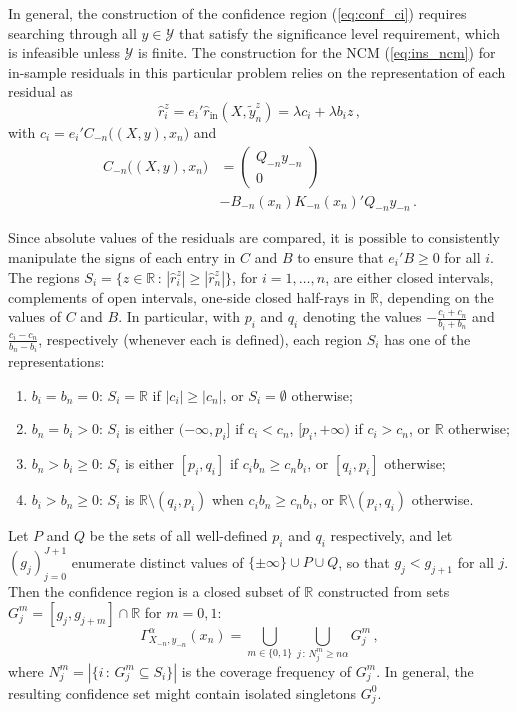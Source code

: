 \documentclass{ITaSconf}
\newcommand{\Ycal}{\mathcal{Y}}
\newcommand{\Real}{\mathbb{R}}
\begin{document}
In general, the construction of the confidence region (\ref{eq:conf_ci}) requires
searching through all $y\in \Ycal$ that satisfy the significance level requirement,
which is infeasible unless $\Ycal$ is finite. The construction for the NCM (\ref{eq:ins_ncm})
for in-sample residuals in this particular problem relies on the representation
of each residual as
\begin{equation*}
  \hat{r}_i^z
    = e_i' \hat{r}_{\text{in}}(X, \tilde{y}_n^z)
    = \lambda c_i + \lambda b_i z
    \,,
\end{equation*}
with $c_i = e_i' C_{-n}\bigl((X, y), x_n\bigr)$ and
\begin{align*}
  C_{-n}\bigl((X, y), x_n\bigr)
    &= \begin{pmatrix} Q_{-n} y_{-n} \\ 0 \end{pmatrix} \\
    &- B_{-n}(x_n) K_{-n}(x_n)' Q_{-n} y_{-n}
    \,.
\end{align*}

Since absolute values of the residuals are compared, it is possible to consistently
manipulate the signs of each entry in $C$ and $B$ to ensure that $e_i'B\geq 0$ for
all $i$. The regions $S_i = \{z\in\Real\,:\, |\hat{r}_i^z| \geq |\hat{r}_n^z|\}$, for
$i=1,\ldots, n$, are either closed intervals, complements of open intervals,
one-side closed half-rays in $\Real$, depending on the values of $C$ and $B$. In
particular, with $p_i$ and $q_i$ denoting the values $-\frac{c_i+c_n}{b_i+b_n}$ and
$\frac{c_i-c_n}{b_n-b_i}$, respectively (whenever each is defined), each region
$S_i$ has one of the representations:
\begin{enumerate}
  \item $b_i=b_n=0$: $S_i = \Real$ if $|c_i| \geq |c_n|$, or $S_i = \emptyset$
  otherwise;
  \item $b_n = b_i > 0$: $S_i$ is either $(-\infty, p_i]$ if $c_i < c_n$, $[p_i, +\infty)$ if
  $c_i > c_n$, or $\Real$ otherwise;
  \item $b_n > b_i \geq 0$: $S_i$ is either $[p_i, q_i]$ if $c_i b_n \geq c_n b_i$,
  or $[q_i, p_i]$ otherwise;
  \item $b_i > b_n \geq 0$: $S_i$ is $\Real\setminus (q_i, p_i)$ when $c_i b_n \geq c_n b_i$,
  or $\Real\setminus (p_i, q_i)$ otherwise.
\end{enumerate}
Let $P$ and $Q$ be the sets of all well-defined $p_i$ and $q_i$ respectively, and
let $(g_j)_{j=0}^{J+1}$ enumerate distinct values of $\{\pm\infty\} \cup P \cup Q$,
so that $g_j < g_{j+1}$ for all $j$. Then the confidence region is a closed subset
of $\Real$ constructed from sets $G^m_j = [g_j, g_{j+m}]\cap \Real$ for $m=0, 1$:
\begin{equation} \label{eq:rrcm_conf_ci}
  \Gamma_{X_{-n}, y_{-n}}^\alpha(x_n)
    = \bigcup_{m\in\{0,1\}} \bigcup_{j\,:\, N^m_j \geq n \alpha} G^m_j
    \,,
\end{equation}
where $N^m_j = |\{i \,:\, G^m_j \subseteq S_i\}|$ is the coverage frequency of $G^m_j$.
In general, the resulting confidence set might contain isolated singletons $G^0_j$.
\end{document}
